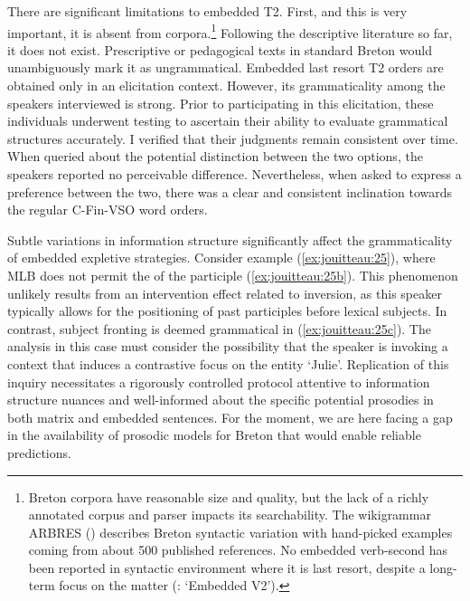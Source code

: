 \documentclass[output=paper,colorlinks,citecolor=brown]{langscibook}
\begin{document}
There are significant limitations to embedded T2. First, and this is very important, it is absent from corpora.\footnote{Breton corpora have reasonable size and quality, but the lack of a richly annotated corpus and parser impacts its searchability. The wikigrammar ARBRES (\citealt{mj:Jouitteau2009}) describes Breton syntactic variation with hand-picked examples coming from about 500 published references. No embedded verb-second has been reported in syntactic environment where it is last resort, despite a long-term focus on the matter (\citealt{mj:Jouitteau2009}: ‘Embedded V2’).} Following the descriptive literature so far, it does not exist. Prescriptive or pedagogical texts in standard Breton would unambiguously mark it as ungrammatical. Embedded last resort T2 orders are obtained only in an elicitation context. However, its grammaticality among the speakers interviewed is strong. Prior to participating in this elicitation, these individuals underwent testing to ascertain their ability to evaluate grammatical structures accurately. I verified that their judgments remain consistent over time. When queried about the potential distinction between the two options, the speakers reported no perceivable difference. Nevertheless, when asked to express a preference between the two, there was a clear and consistent inclination towards the regular C-Fin-VSO word orders. 

Subtle variations in information structure significantly affect the grammaticality of embedded expletive strategies. Consider example (\ref{ex:jouitteau:25}), where MLB does not permit the  of the participle (\ref{ex:jouitteau:25b}). This phenomenon unlikely results from an intervention effect related to inversion, as this speaker typically allows for the positioning of past participles before lexical subjects. In contrast, subject fronting is deemed grammatical in (\ref{ex:jouitteau:25c}). The analysis in this case must consider the possibility that the speaker is invoking a context that induces a contrastive focus on the entity ‘Julie’. Replication of this inquiry necessitates a rigorously controlled protocol attentive to information structure nuances and well-informed about the specific potential prosodies in both matrix and embedded sentences. For the moment, we are here facing a gap in the availability of prosodic models for Breton that would enable reliable predictions. 
\end{document}
